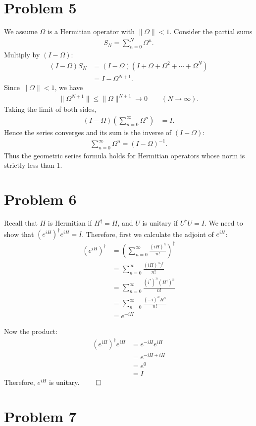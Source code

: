 \documentclass[10pt,twocoloumn]{article}
\begin{document}
\section*{Problem 5}
We assume $\Omega$ is a Hermitian operator with $\|\Omega\|<1$.
Consider the partial sums
\begin{align}
S_N = \sum_{n=0}^N \Omega^n .
\end{align}
Multiply by $(I-\Omega)$:
\begin{align}
(I-\Omega) S_N
&= (I-\Omega)\left(I + \Omega + \Omega^2 + \cdots + \Omega^N\right) \\
&= I - \Omega^{N+1}.
\end{align}
Since $\|\Omega\|<1$, we have
\begin{align}
\|\Omega^{N+1}\| \le \|\Omega\|^{N+1} \longrightarrow 0
\qquad (N\to\infty).
\end{align}
Taking the limit of both sides,
\begin{align}
(I-\Omega)\left( \sum_{n=0}^{\infty} \Omega^n \right)
&= I .
\end{align}
Hence the series converges and its sum is the inverse of $(I-\Omega)$:
\begin{align}
\sum_{n=0}^{\infty} \Omega^n = (I-\Omega)^{-1}.
\end{align}
Thus the geometric series formula holds for Hermitian operators whose norm is strictly less than 1.
\section*{Problem 6}
Recall that $H$ is Hermitian if $H^\dagger = H$, and $U$ is unitary if $U^\dagger U = I$.
We need to show that $(e^{iH})^\dagger e^{iH} = I$.
Therefore, first we calculate the adjoint of $e^{iH}$:
\begin{align}
(e^{iH})^\dagger &= \left(\sum_{n=0}^{\infty} \frac{(iH)^n}{n!}\right)^\dagger \\
&= \sum_{n=0}^{\infty} \frac{(iH)^n)^\dagger}{n!} \\
&= \sum_{n=0}^{\infty} \frac{(i^*)^n (H^\dagger)^n}{n!} \\
&= \sum_{n=0}^{\infty} \frac{(-i)^n H^n}{n!} \\
&= e^{-iH}
\end{align}

Now the product:
\begin{align}
(e^{iH})^\dagger e^{iH} &= e^{-iH} e^{iH} \\
&= e^{-iH + iH} \\
&= e^{0} \\
&= I
\end{align}
Therefore, $e^{iH}$ is unitary. $\qed$
\section*{Problem 7}
\end{document}
